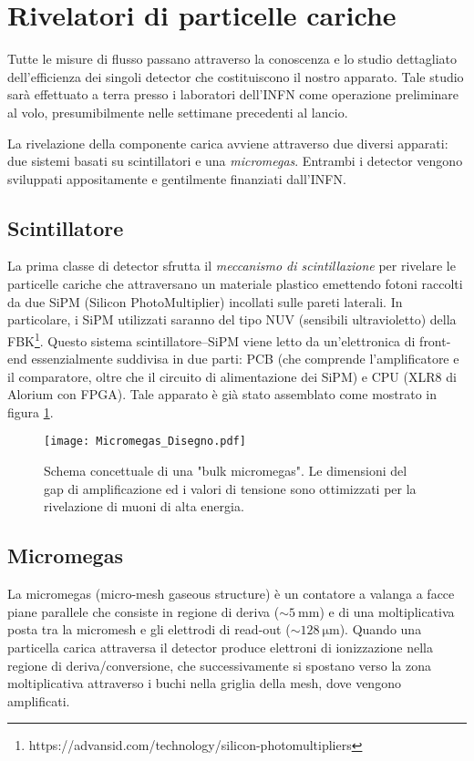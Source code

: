 \section{Rivelatori di particelle cariche}

Tutte le misure di flusso passano attraverso la conoscenza e lo studio dettagliato dell'efficienza dei singoli detector che costituiscono il nostro apparato. Tale studio sarà effettuato a terra presso i laboratori dell'INFN come operazione preliminare al volo, presumibilmente nelle settimane precedenti al lancio. 

La rivelazione della componente carica avviene attraverso due diversi apparati: due sistemi basati su scintillatori e una \emph{micromegas}. Entrambi i detector vengono sviluppati appositamente e gentilmente finanziati dall'INFN. 
\subsection{Scintillatore}
La prima classe di detector sfrutta il \emph{meccanismo di scintillazione} per rivelare le particelle cariche che attraversano un materiale plastico emettendo fotoni raccolti da due SiPM (Silicon PhotoMultiplier) incollati sulle pareti laterali. In particolare, i SiPM utilizzati saranno del tipo NUV (sensibili ultravioletto) della FBK\footnote{https://advansid.com/technology/silicon-photomultipliers}.
Questo sistema scintillatore--SiPM viene letto da un'elettronica di front-end essenzialmente suddivisa in due parti: PCB (che comprende l’amplificatore e il comparatore, oltre che il circuito di alimentazione dei SiPM) e CPU (XLR8 di Alorium con FPGA). Tale apparato è già stato assemblato come mostrato in figura \ref{Micromegas_Disegno}.

\begin{figure}
    \centering
    \texttt{[image: Micromegas\_Disegno.pdf]}
    \caption{Schema concettuale di una "bulk micromegas". Le dimensioni del gap di amplificazione ed i valori di tensione sono ottimizzati per la rivelazione di muoni di alta energia.}
    \label{Micromegas_Disegno}
\end{figure}

\subsection{Micromegas}
La micromegas (micro-mesh gaseous structure) è un contatore a valanga a facce piane parallele che consiste in regione di deriva ($\sim \SI{5}{\milli\metre}$) e di una moltiplicativa posta tra la micromesh e gli elettrodi di read-out ($\sim \SI{128}{\micro\metre}$). 
Quando una particella carica attraversa il detector produce elettroni di ionizzazione nella regione di deriva/conversione, che successivamente si spostano verso la zona moltiplicativa attraverso i buchi nella griglia della mesh, dove vengono amplificati. 

